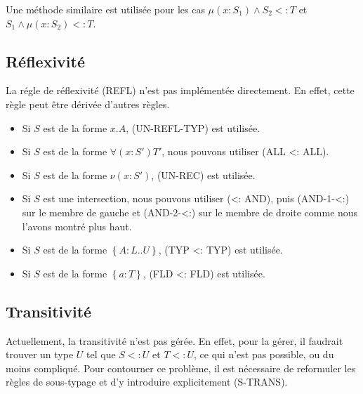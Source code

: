 Une méthode similaire est utilisée pour les cas $\mu(x : S_{1}) \wedge S_{2} <:
T$ et $S_{1} \wedge \mu(x : S_{2}) <: T$.

\subsection*{Réflexivité}

La régle de réflexivité (REFL) n'est pas implémentée directement. En effet,
cette règle peut être dérivée d'autres règles.

\begin{itemize}
  \item Si $S$ est de la forme $x.A$, (UN-REFL-TYP) est utilisée.
  \item Si $S$ est de la forme $\forall(x : S') T'$, nous pouvons utiliser (ALL
    <: ALL).
  \item Si $S$ est de la forme $\nu(x : S')$, (UN-REC) est utilisée.
  \item Si $S$ est une intersection, nous pouvons utiliser (<: AND), puis
    (AND-1-<:) sur le membre de gauche et (AND-2-<:) sur le membre de droite
    comme nous l'avons montré plus haut.
  \item Si $S$ est de la forme $\left\{ A : L .. U \right\}$, (TYP <: TYP) est utilisée.
  \item Si $S$ est de la forme $\left\{ a : T \right\}$, (FLD <: FLD) est utilisée.
\end{itemize}

\subsection*{Transitivité}

Actuellement, la transitivité n'est pas gérée. En effet, pour la gérer, il
faudrait trouver un type $U$ tel que $S <: U$ et $T <: U$, ce qui n'est pas
possible, ou du moins compliqué. Pour contourner ce problème, il est
nécessaire de reformuler les règles de sous-typage et d'y introduire
explicitement (S-TRANS).

%
%
%
%

